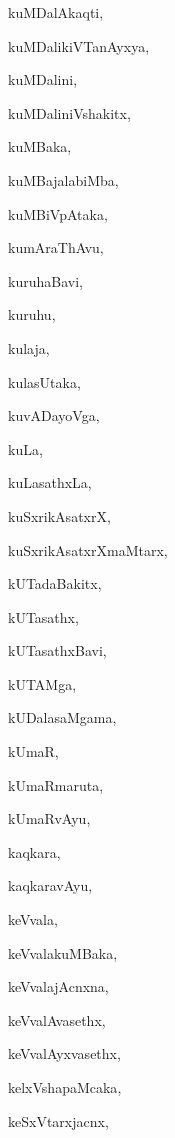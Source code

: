 \begin{multicols}{2}
{kuMDalAkaqti}, \pageref{kuMDalAkaqti}

{kuMDalikiVTanAyxya}, \pageref{kuMDalikiVTanAyxya}

{kuMDalini}, \pageref{kuMDalini}

{kuMDaliniVshakitx}, \pageref{kuMDaliniVshakitx}

{kuMBaka}, \pageref{kuMBaka}

{kuMBajalabiMba}, \pageref{kuMBajalabiMba}

{kuMBiVpAtaka}, \pageref{kuMBiVpAtaka}

{kumAraThAvu}, \pageref{kumAraThAvu}

{kuruhaBavi}, \pageref{kuruhaBavi}

{kuruhu}, \pageref{kuruhu}

{kulaja}, \pageref{kulaja}

{kulasUtaka}, \pageref{kulasUtaka}

{kuvADayoVga}, \pageref{kuvADayoVga}

{kuLa}, \pageref{kuLa}

{kuLasathxLa}, \pageref{kuLasathxLa}

{kuSxrikAsatxrX}, \pageref{kuSxrikAsatxrX}

{kuSxrikAsatxrXmaMtarx}, \pageref{kuSxrikAsatxrXmaMtarx}

{kUTadaBakitx}, \pageref{kUTadaBakitx}

{kUTasathx}, \pageref{kUTasathx}

{kUTasathxBavi}, \pageref{kUTasathxBavi}

{kUTAMga}, \pageref{kUTAMga}

{kUDalasaMgama}, \pageref{kUDalasaMgama}

{kUmaR}, \pageref{kUmaR}

{kUmaRmaruta}, \pageref{kUmaRmaruta}

{kUmaRvAyu}, \pageref{kUmaRvAyu}

{kaqkara}, \pageref{kaqkara}

{kaqkaravAyu}, \pageref{kaqkaravAyu}

{keVvala}, \pageref{keVvala}

{keVvalakuMBaka}, \pageref{keVvalakuMBaka}

{keVvalajAcnxna}, \pageref{keVvalajAcnxna}

{keVvalAvasethx}, \pageref{keVvalAvasethx}

{keVvalAyxvasethx}, \pageref{keVvalAyxvasethx}

{kelxVshapaMcaka}, \pageref{kelxVshapaMcaka}

{keSxVtarxjacnx}, \pageref{keSxVtarxjacnx}


\end{multicols}
